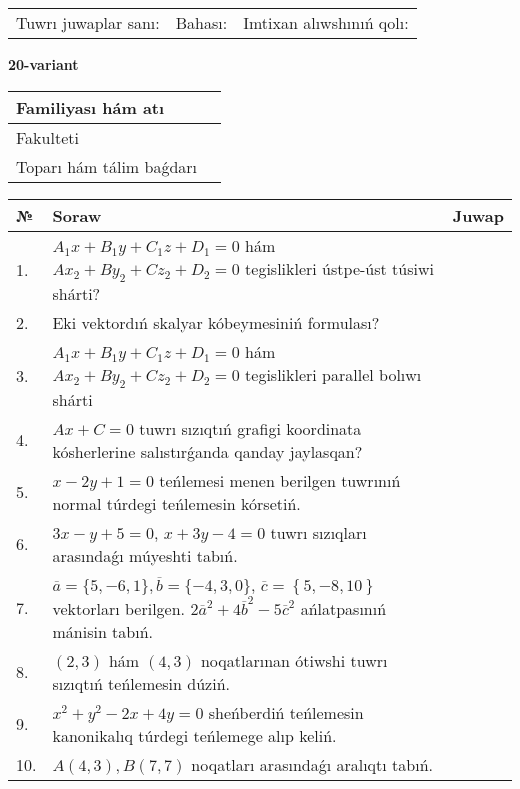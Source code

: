 \documentclass{article}
\begin{document}
\vspace{1cm}

\begin{tabular}{lll}
Tuwrı juwaplar sanı: \underline{\hspace{1.5cm}} & 
Bahası: \underline{\hspace{1.5cm}} & 
Imtixan alıwshınıń qolı: \underline{\hspace{2cm}} \\
\end{tabular}

\egroup

\newpage


\textbf{20-variant}\\

\bgroup
\def\arraystretch{1.6} %

\begin{tabular}{|m{5.7cm}|m{9.5cm}|}
\hline
Familiyası hám atı & \\
\hline
Fakulteti  & \\
\hline
Toparı hám tálim baǵdarı  & \\
\hline
\end{tabular}

\vspace{1cm}

\begin{tabular}{|m{0.7cm}|m{10cm}|m{4cm}|}
\hline
№ & Soraw & Juwap \\
\hline
1. & $A_1x+B_1y+C_1z+D_1=0$ hám $Ax_2+By_2+Cz_2+D_2=0$ tegislikleri ústpe-úst túsiwi shárti? &  \\
\hline
2. & Eki vektordıń skalyar kóbeymesiniń formulası? &  \\
\hline
3. & $A_1x+B_1y+C_1z+D_1=0$ hám $Ax_2+By_2+Cz_2+D_2=0$ tegislikleri parallel bolıwı shárti &  \\
\hline
4. & $Ax+C=0$ tuwrı sızıqtıń grafigi koordinata kósherlerine salıstırǵanda qanday jaylasqan? &  \\
\hline
5. & $x-2y+1=0$ teńlemesi menen berilgen tuwrınıń normal túrdegi teńlemesin kórsetiń. &  \\
\hline
6. & $3x-y+5=0$, $x+3y-4=0$ tuwrı sızıqları arasındaǵı múyeshti tabıń. &  \\
\hline
7. & $\overline{a}=\{5,-6, 1 \}, \overline{b}=\{-4, 3, 0 \} $, $\overline{c}=\left\{ 5,-8, 10 \right\}$ vektorları berilgen. $2{\overline{a}}^{2}+4{\overline{b}}^{2}-5{\overline{c}}^{2}$ ańlatpasınıń mánisin tabıń. &  \\
\hline
8. & $(2, 3)$ hám $(4, 3)$ noqatlarınan ótiwshi tuwrı sızıqtıń teńlemesin dúziń. &  \\
\hline
9. & $x^{2}+y^{2}-2x+4y=0$ sheńberdiń teńlemesin kanonikalıq túrdegi teńlemege alıp keliń. &  \\
\hline
10. & $A(4, 3), B(7, 7)$ noqatları arasındaǵı aralıqtı tabıń. &  \\
\hline
\end{tabular}
\end{document}
